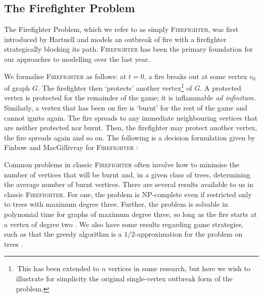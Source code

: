 \documentclass[../report.tex]{subfiles}
\begin{document}
\subsection{The Firefighter Problem}

The Firefighter Problem, which we refer to as simply {\scshape Firefighter}, was first introduced by Hartnell \cite{hartnell_1995} and models an outbreak of fire with a firefighter strategically blocking its path. {\scshape Firefighter} has been the primary foundation for our approaches to modelling over the last year.

We formalise {\scshape Firefighter} as follows: at $t=0$, a fire breaks out at some vertex $v_0$ of graph $G$. The firefighter then `protects' another vertex\footnote{\,This has been extended to $n$ vertices in some research, but here we wish to illustrate for simplicity the original single-vertex outbreak form of the problem.} of $G$. A protected vertex is protected for the remainder of the game; it is inflammable \textit{ad infinitum.} Similarly, a vertex that has been on fire is `burnt' for the rest of the game and cannot ignite again. The fire spreads to any immediate neighbouring vertices that are neither protected nor burnt. Then, the firefighter may protect another vertex, the fire spreads again and so on. The following is a decision formulation given by Finbow and MacGillivray for {\scshape Firefighter} \cite{finbow_2009}:
\vspace{1mm}

\begin{center}
\noindent{}%
\end{center}

Common problems in classic {\scshape Firefighter} often involve how to minimise the number of vertices that will be burnt and, in a given class of trees, determining the average number of burnt vertices. There are several results available to us in classic {\scshape Firefighter}. For one, the problem is NP-complete even if restricted only to trees with maximum degree three. Further, the problem is solvable in polynomial time for graphs of maximum degree three, so long as the fire starts at a vertex of degree two \cite{finbow_2009}. We also have some results regarding game strategies, such as that the greedy algorithm is a $1/2$-approximation for the problem on trees \cite{finbow_2009}.
\end{document}
